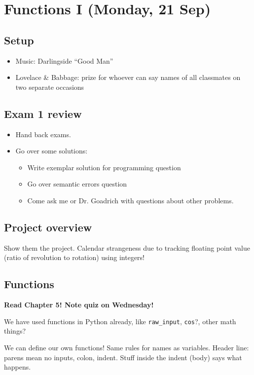 \documentclass{article}
\begin{document}
\section*{Functions I (Monday, 21 Sep)}

\subsection*{Setup}
\begin{itemize}
\item Music: Darlingside ``Good Man''
\item Lovelace \& Babbage: prize for whoever can say names of all
  classmates on two separate occasions
\end{itemize}

\subsection*{Exam 1 review}
\begin{itemize}
\item Hand back exams.
\item Go over some solutions:
  \begin{itemize}
  \item Write exemplar solution for programming question
  \item Go over semantic errors question
  \item Come ask me or Dr. Goadrich with questions about other problems.
  \end{itemize}
\end{itemize}

\subsection*{Project overview}

Show them the project.  Calendar strangeness due to tracking floating
point value (ratio of revolution to rotation) using integers!

\subsection*{Functions}

\textbf{Read Chapter 5! Note quiz on Wednesday!}

We have used functions in Python already, like \verb|raw_input|,
\verb|cos|?, other math things?

We can define our own functions!  Same rules for names as
variables. Header line: parens mean no inputs, colon, indent.  Stuff
inside the indent (body) says what happens.
\end{document}
